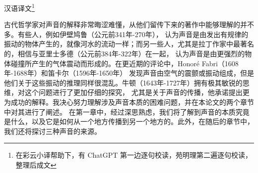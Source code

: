 \documentclass[a4paper,12pt]{article}
\numberwithin{problem}{section}
\numberwithin{definition}{section}
\numberwithin{lemma}{section}
\numberwithin{proposition}{section}
\numberwithin{theorem}{section}
\numberwithin{grammar}{section}
\numberwithin{program}{section}
\numberwithin{convention}{section}
\numberwithin{corollary}{section}
\begin{document}
汉语译文\footnote{在彩云小译帮助下，有 ChatGPT 第一边逐句校读，苑明理第二遍逐句校读，整理后成文}
\begin{displayquote}
古代哲学家对声音的解释非常晦涩难懂，从他们留传下来的著作中能够理解的并不多。有些人，例如伊壁鸠鲁（公元前341年-270年），
认为声音是由发出有规律的振动的物体产生的，就像河水的流动一样；而另一些人，尤其是拉丁作家中最著名的，相信与亚里士多德（公元前384年-322年）在一起，
认为声音是由更强烈的物体碰撞所产生的气体震动而形成的。在更近期的评论中，Honoré Fabri（1608年-1688年）和笛卡尔（1596年-1650年）
发现声音由空气的震颤或振动组成，但是他们关于这些振动的推理同样很混乱。牛顿（1643年-1727年）拥有极其敏锐的思维，对这个问题进行了更加仔细的探究，
尤其是关于声音的传播，他承诺提出更为成功的解释。我决心努力理解涉及声音本质的困难问题，并在本论文的两个章节中对其进行了阐述。
在第一章中，经过深思熟虑，我们将了解到声音的本质究竟是什么，以及它是如何从一个地方传播到另一个地方的。此外，在随后的章节中，我们还将探讨三种声音的来源。
\end{displayquote}
\end{document}

